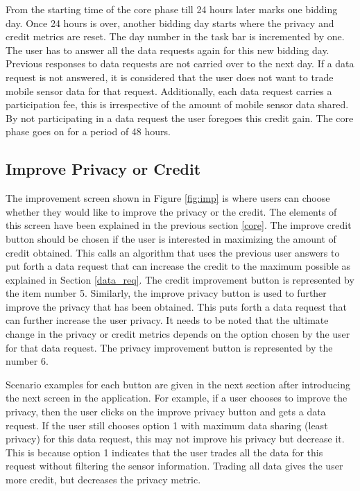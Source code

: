 From the starting time of the core phase till 24 hours later marks one bidding day. Once 24 hours is over, another bidding day starts where the privacy and credit metrics are reset. The day number in the task bar is incremented by one. The user has to answer all the data requests again for this new bidding day. Previous responses to data requests are not carried over to the next day. If a data request is not answered, it is considered that the user does not want to trade mobile sensor data for that request. Additionally, each data request carries a participation fee, this is irrespective of the amount of mobile sensor data shared. By not participating in a data request the user foregoes this credit gain.
The core phase goes on for a period of 48 hours. 

\subsection{Improve Privacy or Credit}

The improvement screen shown in Figure \ref{fig:imp} is where users can choose whether they would like to improve the privacy or the credit. The elements of this screen have been explained in the previous section \ref{core}.
The improve credit button
should be chosen if the user is interested in maximizing the amount of credit obtained. This calls an algorithm that uses the previous user answers to
put forth a data request that can increase the credit to the maximum possible as explained in Section \ref{data_req}. The credit improvement button is represented by the item number 5. Similarly, the improve privacy button is used to further improve the privacy that has been obtained. This puts forth a data request that can further increase the user privacy. It needs to be noted that the ultimate change in the privacy or credit metrics depends on the option chosen by the user for that data request. The privacy improvement button is represented by the number 6.

Scenario examples for each button are given in the next section after introducing the next screen in the application. For example, if a user chooses to improve the privacy, then the user clicks on the improve privacy button and gets a data request. If the user still chooses option 1 with maximum data sharing (least privacy) for this data request, this may not improve his privacy but decrease it. This is because option 1 indicates that the user trades all the data for this request without filtering the sensor information. Trading all data gives the user more credit, but decreases the privacy metric.

